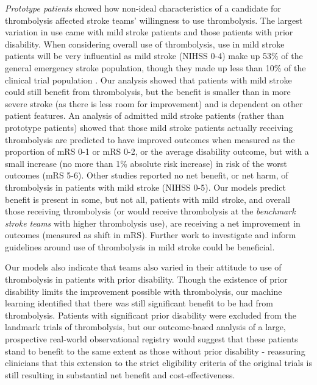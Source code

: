 \textit{Prototype patients} showed how non-ideal characteristics of a candidate for thrombolysis affected stroke teams' willingness to use thrombolysis. The largest variation in use came with mild stroke patients and those patients with prior disability. When considering overall use of thrombolysis, use in mild stroke patients will be very influential as mild stroke (NIHSS 0-4) make up 53\% of the general emergency stroke population, though they made up less than 10\% of the clinical trial population \cite{emberson_effect_2014}. Our analysis showed that patients with mild stroke could still benefit from thrombolysis, but the benefit is smaller than in more severe stroke (as there is less room for improvement) and is dependent on other patient features. An analysis of admitted mild stroke patients (rather than prototype patients) showed that those mild stroke patients actually receiving thrombolysis are predicted to have improved outcomes when measured as the proportion of mRS 0-1 or mRS 0-2, or the average disability outcome, but with a small increase (no more than 1\% absolute risk increase) in risk of the worst outcomes (mRS 5-6). Other studies \cite{romano_predictors_2021, coutts_tenecteplase_2024} reported no net benefit, or net harm, of thrombolysis in patients with mild stroke (NIHSS 0-5). Our models predict benefit is present in some, but not all, patients with mild stroke, and overall those receiving thrombolysis (or would receive thrombolysis at the \textit{benchmark stroke teams} with higher thrombolysis use), are receiving a net improvement in outcomes (measured as shift in mRS).  Further work to investigate and inform guidelines around use of thrombolysis in mild stroke could be beneficial.

Our models also indicate that teams also varied in their attitude to use of thrombolysis in patients with prior disability. Though the existence of prior disability limits the improvement possible with thrombolysis, our machine learning identified that there was still significant benefit to be had from thrombolysis. Patients with significant prior disability were excluded from the landmark trials of thrombolysis, but our outcome-based analysis of a large, prospective real-world observational registry would suggest that these patients stand to benefit to the same extent as those without prior disability - reassuring clinicians that this extension to the strict eligibility criteria of the original trials is still resulting in substantial net benefit and cost-effectiveness. 

